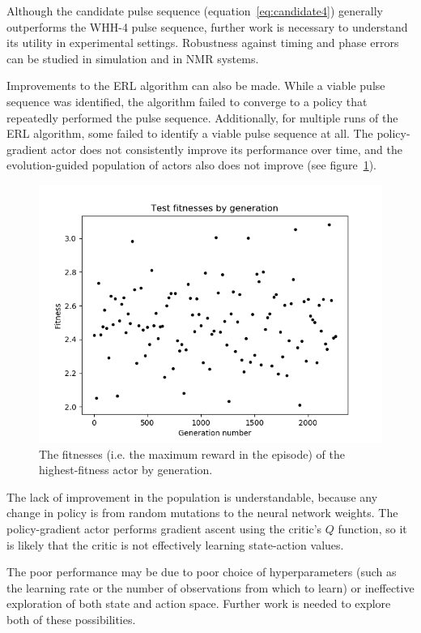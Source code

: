 \documentclass{article}
\begin{document}
Although the candidate pulse sequence (equation~\ref{eq:candidate4}) generally outperforms the WHH-4 pulse sequence, further work is necessary to understand its utility in experimental settings. Robustness against timing and phase errors can be studied in simulation and in NMR systems.

Improvements to the ERL algorithm can also be made. While a viable pulse sequence was identified, the algorithm failed to converge to a policy that repeatedly performed the pulse sequence. Additionally, for multiple runs of the ERL algorithm, some failed to identify a viable pulse sequence at all. The policy-gradient actor does not consistently improve its performance over time, and the evolution-guided population of actors also does not improve (see figure~\ref{fig:results}).
\begin{figure}[H]
    \centering
    \includegraphics[width=0.7\linewidth]{graphics/test_fit.png}
    \caption{The fitnesses (i.e. the maximum reward in the episode) of the highest-fitness actor by generation.}
    \label{fig:results}
\end{figure}
The lack of improvement in the population is understandable, because any change in policy is from random mutations to the neural network weights. The policy-gradient actor performs gradient ascent using the critic's $Q$ function, so it is likely that the critic is not effectively learning state-action values.

The poor performance may be due to poor choice of hyperparameters (such as the learning rate or the number of observations from which to learn) or ineffective exploration of both state and action space.
Further work is needed to explore both of these possibilities.

\printbibliography
\end{document}
